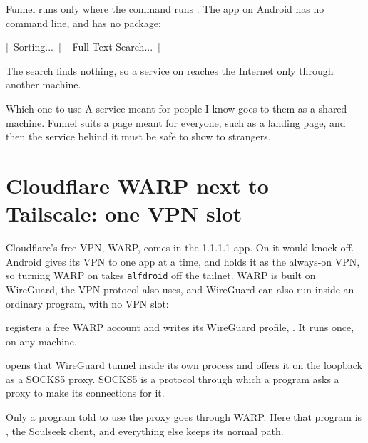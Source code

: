 \documentclass[11pt,a4paper]{article}
\renewcommand{\panetitle}{Shared pane 5.2, logged in to \name{AlfSPARK}}
\begin{document}
Funnel runs only where the  command runs \cite{tsfunnel}. The  app on Android has no command line, and  has no  package:

\renewcommand{\panetitle}{A shell on \name{AlfDROID}, in \name{Termux}}
\begin{cmdout}
|~Sorting...~|
|~Full Text Search...~|
\end{cmdout}

The search finds nothing, so a service on  reaches the Internet only through another machine.

\begin{result}{Which one to use}
A service meant for people I know goes to them as a shared machine. Funnel suits a page meant for everyone, such as a landing page, and then the service behind it must be safe to show to strangers.
\end{result}

\section{Cloudflare WARP next to Tailscale: one VPN slot}

Cloudflare's free VPN, WARP, comes in the 1.1.1.1 app. On  it would knock  off. Android gives its VPN to one app at a time, and  holds it as the always-on VPN, so turning WARP on takes \texttt{alfdroid} off the tailnet. WARP is built on WireGuard, the VPN protocol  also uses, and WireGuard can also run inside an ordinary program, with no VPN slot:

\begin{compactitemize}
  \item {} registers a free WARP account and writes its WireGuard profile, . It runs once, on any machine.
  \item {} opens that WireGuard tunnel inside its own process and offers it on the loopback as a SOCKS5 proxy. SOCKS5 is a protocol through which a program asks a proxy to make its connections for it.
  \item Only a program told to use the proxy goes through WARP. Here that program is , the Soulseek client, and everything else keeps its normal path.
\end{compactitemize}
\end{document}
